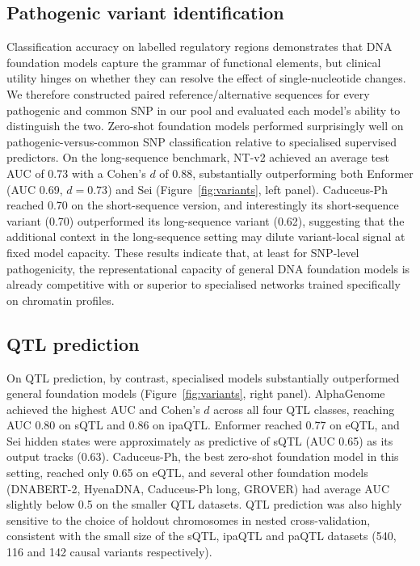 \documentclass[11pt,a4paper]{article}
\begin{document}
\subsection{Pathogenic variant identification}
Classification accuracy on labelled regulatory regions demonstrates that DNA foundation models capture the grammar of functional elements, but clinical utility hinges on whether they can resolve the effect of single-nucleotide changes. We therefore constructed paired reference/alternative sequences for every pathogenic and common SNP in our pool and evaluated each model's ability to distinguish the two. Zero-shot foundation models performed surprisingly well on pathogenic-versus-common SNP classification relative to specialised supervised predictors. On the long-sequence benchmark, NT-v2 achieved an average test AUC of 0.73 with a Cohen's $d$ of 0.88, substantially outperforming both Enformer (AUC 0.69, $d = 0.73$) and Sei (Figure~\ref{fig:variants}, left panel). Caduceus-Ph reached 0.70 on the short-sequence version, and interestingly its short-sequence variant (0.70) outperformed its long-sequence variant (0.62), suggesting that the additional context in the long-sequence setting may dilute variant-local signal at fixed model capacity. These results indicate that, at least for SNP-level pathogenicity, the representational capacity of general DNA foundation models is already competitive with or superior to specialised networks trained specifically on chromatin profiles.

\subsection{QTL prediction}
On QTL prediction, by contrast, specialised models substantially outperformed general foundation models (Figure~\ref{fig:variants}, right panel). AlphaGenome achieved the highest AUC and Cohen's $d$ across all four QTL classes, reaching AUC 0.80 on sQTL and 0.86 on ipaQTL. Enformer reached 0.77 on eQTL, and Sei hidden states were approximately as predictive of sQTL (AUC 0.65) as its output tracks (0.63). Caduceus-Ph, the best zero-shot foundation model in this setting, reached only 0.65 on eQTL, and several other foundation models (DNABERT-2, HyenaDNA, Caduceus-Ph long, GROVER) had average AUC slightly below 0.5 on the smaller QTL datasets. QTL prediction was also highly sensitive to the choice of holdout chromosomes in nested cross-validation, consistent with the small size of the sQTL, ipaQTL and paQTL datasets (540, 116 and 142 causal variants respectively).
\end{document}
